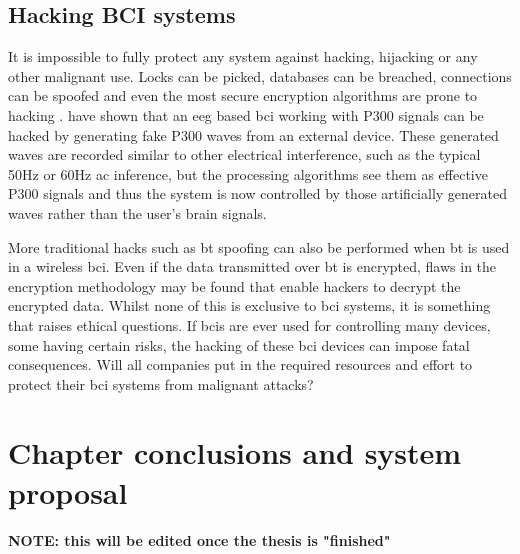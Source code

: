 
\subsection{Hacking BCI systems}
\label{subsec:bci_ethical_hacking}

It is impossible to fully protect any system against hacking, hijacking or any other malignant use.
Locks can be picked, databases can be breached,  connections can be spoofed and even the most secure encryption algorithms are prone to hacking \citep{quantum_hacking}.
 have shown that an \gls{eeg} based \gls{bci} working with P300 signals can be hacked by generating fake P300 waves from an external device.
These generated waves are recorded similar to other electrical interference, such as the typical 50Hz or 60Hz \gls{ac} inference, but the processing algorithms see them as effective P300 signals and thus the system is now controlled by those artificially generated waves rather than the user's brain signals.

More traditional hacks such as \gls{bt} spoofing can also be performed when \gls{bt} is used in a wireless \gls{bci}.
Even if the data transmitted over \gls{bt} is encrypted, flaws in the encryption methodology may be found that enable hackers to decrypt the encrypted data.
Whilst none of this is exclusive to \gls{bci} systems, it is something that raises ethical questions.
If \glspl{bci} are ever used for controlling many devices, some having certain risks, the hacking of these \gls{bci} devices can impose fatal consequences.
Will all companies put in the required resources and effort to protect their \gls{bci} systems from malignant attacks?


\section{Chapter conclusions and system proposal}
\label{sec:bci_concolusion_and_proposing_ours}




\textbf{NOTE: this will be edited once the thesis is "finished"}

